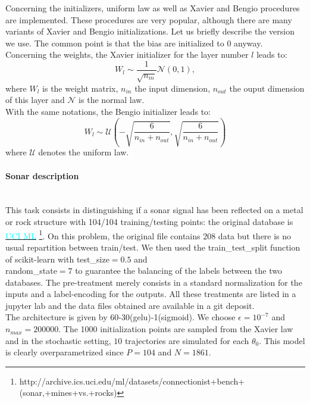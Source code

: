 Concerning the initializers, uniform law as well as Xavier and Bengio procedures \cite{Xavier} are implemented. These procedures are very popular, although there are many variants of Xavier and Bengio initializations. Let us briefly describe the version we use. The common point is that the bias are initialized to 0 anyway. Concerning the weights, the Xavier initializer for the layer number $l$ leads to:
\begin{equation*}
	W_l \sim \dfrac{1}{\sqrt{n_{in}}}\mathcal{N}(0,1),
\end{equation*}
where $W_l$ is the weight matrix, $n_{in}$ the input dimension, $n_{out}$ the ouput dimension of this layer and $\mathcal{N}$ is the normal law.\\
With the same notations, the Bengio initializer leads to:
\begin{equation*}
	W_l \sim \mathcal{U}\left(-\sqrt{\dfrac{6}{n_{in}+n_{out}}},\sqrt{\dfrac{6}{n_{in}+n_{out}}}\right)
\end{equation*}
where $\mathcal{U}$ denotes the uniform law. 

\paragraph{Sonar description} 
~~\\
This task consists in distinguishing if a sonar signal has been reflected on a metal or rock structure with 104/104 training/testing points: the original database is \href{http://archive.ics.uci.edu/ml/datasets/connectionist+bench+(sonar,+mines+vs.+rocks)}{\textcolor{cyan}{UCI ML}} \footnote{http://archive.ics.uci.edu/ml/datasets/connectionist+bench+(sonar,+mines+vs.+rocks)}. On this problem, the original file contains 208 data but there is no usual repartition between train/test. We then used the train\_test\_split function of scikit-learn with test\_size$=0.5$ and \\ random\_state$=7$ to guarantee the balancing of the labels between the two databases. The pre-treatment merely consists in a standard normalization for the inputs and a label-encoding for the outputs. All these treatments are listed in a jupyter lab and the data files obtained are available in a git deposit.  \\
The architecture is given by 60-30(gelu)-1(sigmoid). We choose $\epsilon=10^{-7}$ and $n_{max}=200000$. The 1000 initialization points are sampled from the Xavier law and in the stochastic setting, $10$ trajectories are simulated for each $\theta_0$. This model is clearly overparametrized since $P=104$ and $N=1861$. 

